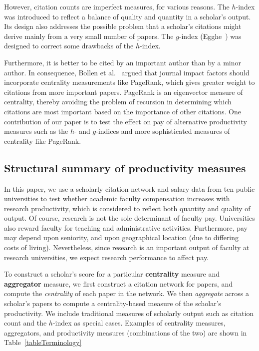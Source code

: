 However, citation counts are imperfect measures, for various reasons. The $h$-index was introduced to reflect a balance of quality and quantity in a scholar’s output. Its design also addresses the possible problem that a scholar’s citations might derive mainly from a very small number of papers. The $g$-index  (Egghe~\cite{egghe2006Gindex}) was designed to correct some drawbacks of the $h$-index.  

Furthermore, it is better to be cited by an important author than by a minor author. In consequence, Bollen et al.~\cite{bollen2006} argued that journal impact factors should incorporate centrality measurements like PageRank, which gives greater weight to citations from more important papers. PageRank is an eigenvector measure of centrality, thereby avoiding the problem of recursion in determining which citations are most important based on the importance of other citations. One contribution of our paper is to test the effect on pay of alternative productivity measures such as the $h$- and $g$-indices and more sophisticated measures of centrality like PageRank.

\subsection{Structural summary of productivity measures}
In this paper, we use a scholarly citation network and salary data from ten public universities to test whether academic faculty compensation increases with research productivity, which is considered to reflect both quantity and quality of output. Of course, research is not the sole determinant of faculty pay. Universities also reward faculty for teaching and administrative activities. Furthermore, pay may depend upon seniority, and upon geographical location (due to differing costs of living). Nevertheless, since research is an important output of faculty at research universities, we expect research performance to affect pay.

To construct a scholar’s score for a particular \textbf{centrality} measure and \textbf{aggregator} measure, we first construct a citation network for papers, and compute the \emph{centrality} of each paper in the network. We then \emph{aggregate} across a scholar’s papers to compute a centrality-based measure of the scholar’s productivity. We include traditional measures of scholarly output such as citation count and the $h$-index as special cases. Examples of centrality measures, aggregators, and productivity measures (combinations of the two) are shown in Table~\ref{tableTerminology}


